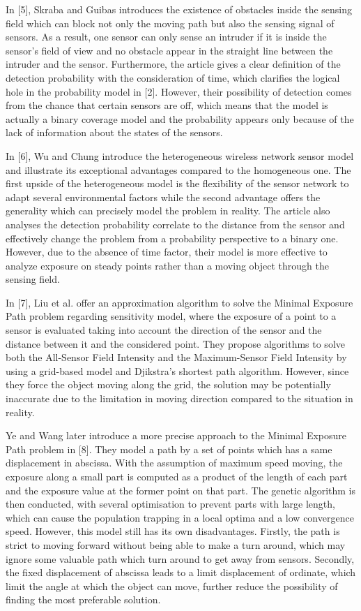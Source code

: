 \documentclass[final]{elsarticle}
\begin{document}
In [5], Skraba and Guibas introduces the existence of obstacles inside the sensing field which can block not only the moving path but also the sensing signal of sensors. As a result, one sensor can only sense an intruder if it is inside the sensor's field of view and no obstacle appear in the straight line between the intruder and the sensor. Furthermore, the article gives a clear definition of the detection probability with the consideration of time, which clarifies the logical hole in the probability model in [2]. However, their possibility of detection comes from the chance that certain sensors are off, which means that the model is actually a binary coverage model and the probability appears only because of the lack of information about the states of the sensors.

In [6], Wu and Chung introduce the heterogeneous wireless network sensor model and illustrate its exceptional advantages compared to the homogeneous one. The first upside of the heterogeneous model is the flexibility of the sensor network to adapt several environmental factors while the second advantage offers the generality which can precisely model the problem in reality. The article also analyses the detection probability correlate to the distance from the sensor and effectively change the problem from a probability perspective to a binary one. However, due to the absence of time factor, their model is more effective to analyze exposure on steady points rather than a moving object through the sensing field.

In [7], Liu et al. offer an approximation algorithm to solve the Minimal Exposure Path problem regarding sensitivity model, where the exposure of a point to a sensor is evaluated taking into account the direction of the sensor and the distance between it and the considered point. They propose algorithms to solve both the All-Sensor Field Intensity and the  Maximum-Sensor Field Intensity by using a grid-based model and Djikstra's shortest path algorithm. However, since they force the object moving along the grid, the solution may be potentially inaccurate due to the limitation in moving direction compared to the situation in reality.

Ye and Wang later introduce a more precise approach to the Minimal Exposure Path problem in [8]. They model a path by a set of points which has a same displacement in abscissa. With the assumption of maximum speed moving, the exposure along a small part is computed as a product of the length of each part and the exposure value at the former point on that part. The genetic algorithm is then conducted, with several optimisation to prevent parts with large length, which can cause the population trapping in a local optima and a low convergence speed. However, this model still has its own disadvantages. Firstly, the path is strict to moving forward without being able to make a turn around, which may ignore some valuable path which turn around to get away from sensors. Secondly, the fixed displacement of abscissa leads to a limit displacement of ordinate, which limit the angle at which the object can move, further reduce the possibility of finding the most preferable solution.
\end{document}
